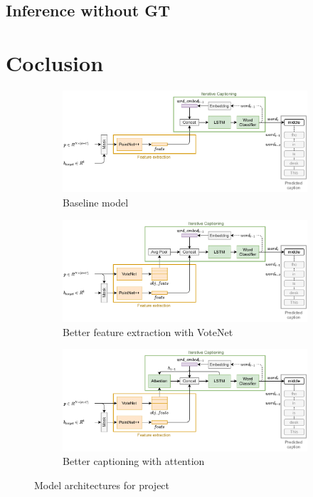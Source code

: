 \documentclass[10pt,twocolumn,letterpaper]{article}
\begin{document}
\subsection{Inference without GT}

\section{Coclusion}

\begin{figure}
	\begin{subfigure}[c]{\textwidth}
		\centering
		\includegraphics[width=\textwidth]{figures/arch_baseline.pdf}
		\caption{Baseline model}
		\label{fig:baseline}
	\end{subfigure}
	\begin{subfigure}[c]{\textwidth}
		\centering
		\includegraphics[width=\textwidth]{figures/arch_votenet.pdf}
		\caption{Better feature extraction with VoteNet}
		\label{fig:votenet}
	\end{subfigure}
	\begin{subfigure}[c]{\textwidth}
		\centering
		\includegraphics[width=\textwidth]{figures/arch_attention.pdf}
		\caption{Better captioning with attention}
		\label{fig:attention}
	\end{subfigure}
	\caption{Model architectures for project}
	\label{fig:architectures}
\end{figure}
\end{document}
